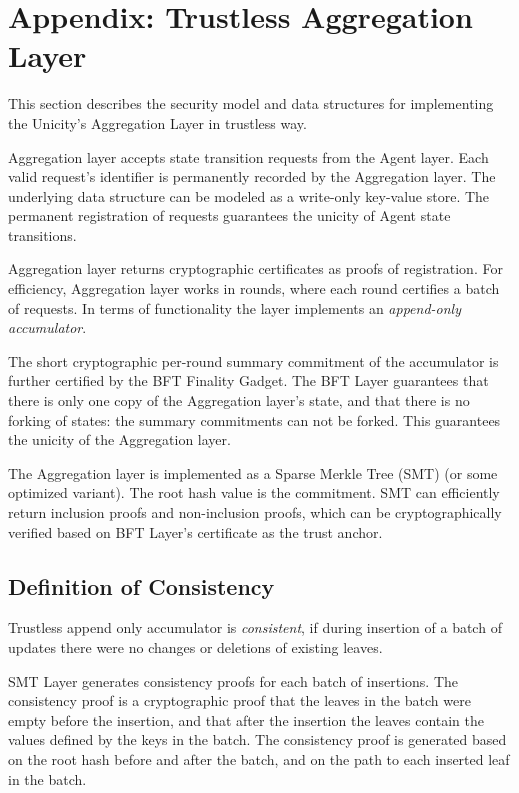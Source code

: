 
\section{Appendix: Trustless Aggregation Layer}

This section describes the security model and data structures for implementing the Unicity's Aggregation Layer in trustless way.

Aggregation layer accepts state transition requests from the Agent layer. Each valid request's identifier is permanently recorded by the Aggregation layer. The underlying data structure can be modeled as a write-only key-value store. The permanent registration of requests guarantees the unicity of Agent state transitions.

Aggregation layer returns cryptographic certificates as proofs of registration. For efficiency, Aggregation layer works in rounds, where each round certifies a batch of requests. In terms of functionality the layer implements an \emph{append-only accumulator}.

The short cryptographic per-round summary commitment of the accumulator is further certified by the BFT Finality Gadget. The BFT Layer guarantees that there is only one copy of the Aggregation layer's state, and that there is no forking of states: the summary commitments can not be forked. This guarantees the unicity of the Aggregation layer.

The Aggregation layer is implemented as a Sparse Merkle Tree (SMT) (or some optimized variant). The root hash value is the commitment. SMT can efficiently return inclusion proofs and non-inclusion proofs, which can be cryptographically verified based on BFT Layer's certificate as the trust anchor.

\subsection{Definition of Consistency}

Trustless append only accumulator is \emph{consistent}, if during insertion of a batch of updates there were no changes or deletions of existing leaves.

SMT Layer generates consistency proofs for each batch of insertions. The consistency proof is a cryptographic proof that the leaves in the batch were empty before the insertion, and that after the insertion the leaves contain the values defined by the keys in the batch. The consistency proof is generated based on the root hash before and after the batch, and on the path to each inserted leaf in the batch.

